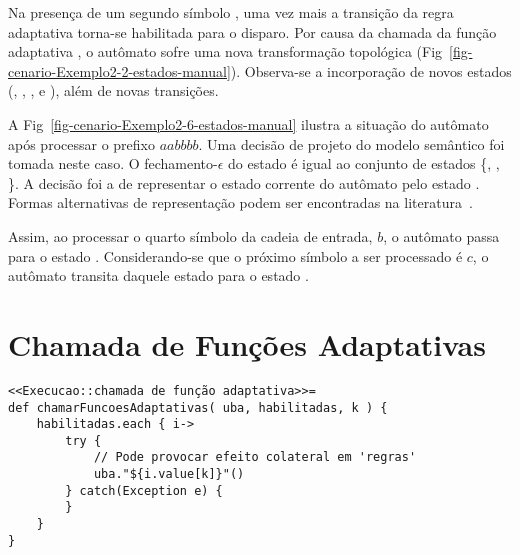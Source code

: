 
Na presença de um segundo símbolo , uma vez mais a transição da regra adaptativa  torna-se habilitada para o disparo. Por causa da chamada da função adaptativa , o autômato  sofre uma nova transformação topológica (Fig~\ref{fig-cenario-Exemplo2-2-estados-manual}). Observa-se a incorporação de novos estados (, , ,  e ), além de novas transições.


A Fig~\ref{fig-cenario-Exemplo2-6-estados-manual} ilustra a situação do autômato após processar o prefixo $aabbbb$. Uma decisão de projeto do modelo semântico foi tomada neste caso. O fechamento-$\epsilon$ do estado  é igual ao conjunto de estados \{, , \}. A decisão foi a de representar o estado corrente do autômato pelo estado . Formas alternativas de representação podem ser encontradas na literatura~\cite{ramos:2009:lftmi}.


Assim, ao processar o quarto símbolo da cadeia de entrada, $b$, o autômato  passa para o estado . Considerando-se que o próximo símbolo a ser processado é $c$, o autômato transita daquele estado para o estado .


\section{Chamada de Funções Adaptativas}
\label{sec:isv:execucao-cfa}

\begin{lstlisting}
<<Execucao::chamada de função adaptativa>>=
def chamarFuncoesAdaptativas( uba, habilitadas, k ) {
    habilitadas.each { i->
        try {
            // Pode provocar efeito colateral em 'regras'
            uba."${i.value[k]}"()
        } catch(Exception e) {
        }
    }
}
\end{lstlisting}

